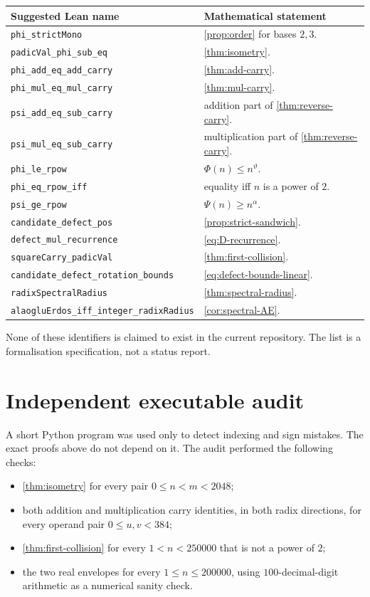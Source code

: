 \documentclass[11pt]{article}
\theoremstyle{definition}
\theoremstyle{remark}
\newcommand{\PhiMap}{\Phi}
\newcommand{\PsiMap}{\Psi}
\newcommand{\thetaAE}{\vartheta}
\newcommand{\alphaAE}{\alpha}
\begin{document}
\begin{longtable}{p{}p{}}
\toprule
Suggested Lean name & Mathematical statement\\
\midrule
\endhead
\texttt{phi\_strictMono} & \cref{prop:order} for bases $2,3$.\\
\texttt{padicVal\_phi\_sub\_eq} & \cref{thm:isometry}.\\
\texttt{phi\_add\_eq\_add\_carry} & \cref{thm:add-carry}.\\
\texttt{phi\_mul\_eq\_mul\_carry} & \cref{thm:mul-carry}.\\
\texttt{psi\_add\_eq\_sub\_carry} & addition part of \cref{thm:reverse-carry}.\\
\texttt{psi\_mul\_eq\_sub\_carry} & multiplication part of \cref{thm:reverse-carry}.\\
\texttt{phi\_le\_rpow} & $\PhiMap(n)\le n^{\thetaAE}$.\\
\texttt{phi\_eq\_rpow\_iff} & equality iff $n$ is a power of $2$.\\
\texttt{psi\_ge\_rpow} & $\PsiMap(n)\ge n^{\alphaAE}$.\\
\texttt{candidate\_defect\_pos} & \cref{prop:strict-sandwich}.\\
\texttt{defect\_mul\_recurrence} & \eqref{eq:D-recurrence}.\\
\texttt{squareCarry\_padicVal} & \cref{thm:first-collision}.\\
\texttt{candidate\_defect\_rotation\_bounds} & \eqref{eq:defect-bounds-linear}.\\
\texttt{radixSpectralRadius} & \cref{thm:spectral-radius}.\\
\nolinkurl{alaogluErdos_iff_integer_radixRadius} & \cref{cor:spectral-AE}.\\
\bottomrule
\end{longtable}

None of these identifiers is claimed to exist in the current repository.  The
list is a formalisation specification, not a status report.

\section{Independent executable audit}

A short Python program was used only to detect indexing and sign mistakes.
The exact proofs above do not depend on it.  The audit performed the following
checks:

\begin{itemize}
\item \cref{thm:isometry} for every pair $0\le n<m<2048$;
\item both addition and multiplication carry identities, in both radix
directions, for every operand pair $0\le u,v<384$;
\item \cref{thm:first-collision} for every $1<n<250000$ that is not a power
of $2$;
\item the two real envelopes for every $1\le n\le200000$, using
$100$-decimal-digit arithmetic as a numerical sanity check.
\end{itemize}
\end{document}
